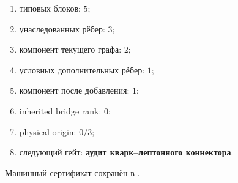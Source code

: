 \begin{protocol}\begin{enumerate}
\item типовых блоков: \textbf{$5$};
\item унаследованных рёбер: \textbf{$3$};
\item компонент текущего графа: \textbf{$2$};
\item условных дополнительных рёбер: \textbf{$1$};
\item компонент после добавления: \textbf{$1$};
\item inherited bridge rank: \textbf{$0$};
\item physical origin: \textbf{$0/3$};
\item следующий гейт: \textbf{аудит кварк--лептонного коннектора}.
\end{enumerate}\end{protocol}

Машинный сертификат сохранён в
.